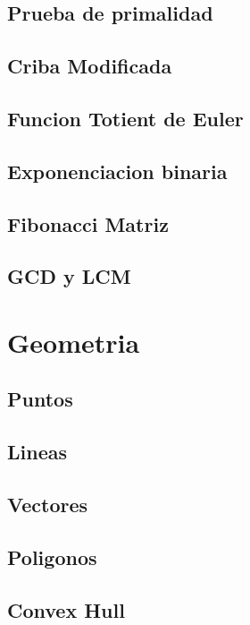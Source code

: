 \subsection{Prueba de primalidad}
\raggedbottom
\hrulefill
\subsection{Criba Modificada}
\raggedbottom
\hrulefill
\subsection{Funcion Totient de Euler}
\raggedbottom
\hrulefill
\subsection{Exponenciacion binaria}
\raggedbottom
\hrulefill
\subsection{Fibonacci Matriz}
\raggedbottom
\hrulefill
\subsection{GCD y LCM}
\raggedbottom
\hrulefill

\section{Geometria}
\subsection{Puntos}
\raggedbottom
\hrulefill
\subsection{Lineas}
\raggedbottom
\hrulefill
\subsection{Vectores}
\raggedbottom
\hrulefill
\subsection{Poligonos}
\raggedbottom
\hrulefill
\subsection{Convex Hull}
\raggedbottom
\hrulefill

